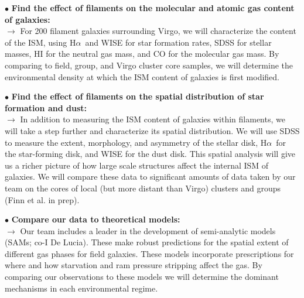 \documentclass[11pt, preprint]{aastex}
\newcommand{\ha}{H$\alpha$}
\begin{document}
\noindent $\bullet$ \textbf{Find the effect of filaments on the molecular and atomic gas content of galaxies:}\\ $\rightarrow$ 
For 200 filament galaxies surrounding Virgo, we will characterize the
content of the ISM, using \ha\ and WISE for star formation rates,
SDSS for stellar masses, HI for the neutral gas mass, and CO for the
molecular gas mass. By comparing to field, group, and Virgo cluster
core samples, we will determine the environmental density at which the
ISM content of galaxies is first modified.
%
  
\noindent $\bullet$ \textbf{Find the effect of filaments
  on the spatial distribution of star formation and
  dust:}\\ $\rightarrow$
In addition to measuring the ISM content of galaxies within filaments, we will take a step further and characterize its spatial distribution. We will use SDSS to measure the extent, morphology, and asymmetry of the stellar disk, \ha\ for the star-forming disk, and WISE for the dust disk. This spatial analysis will give us a richer picture of how large scale structures affect the internal ISM of galaxies. We will compare these data to significant amounts of data taken by our team on the cores of local (but more distant than Virgo) clusters and groups (Finn et al. in prep). 
  
\noindent $\bullet$ \textbf{Compare our data to theoretical models:}\\
$\rightarrow$ 
Our team includes a leader in the development of semi-analytic models (SAMs; co-I De Lucia).  These make robust predictions for
the spatial extent of different gas phases for field galaxies. These
models incorporate prescriptions for where and how starvation and ram
pressure stripping affect the gas. By comparing our observations to
these models we will  determine the  dominant mechanisms in each environmental regime. 
\end{document}
